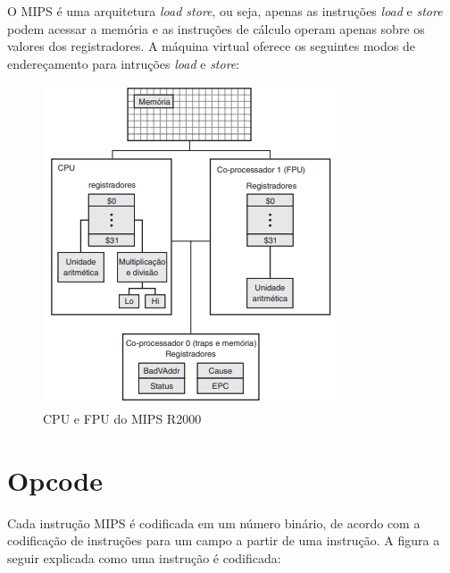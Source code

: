 \documentclass[
	12pt,				%
	oneside,			%
	a4paper,			%
	english,			%
	brazil				%
	]{abntex2ppgsi}
\begin{document}
O MIPS é uma arquitetura \textit{load store}, ou seja, apenas as instruções \textit{load} e \textit{store} podem acessar a memória e as instruções de cálculo operam apenas sobre os valores dos registradores. A máquina virtual oferece os seguintes modos de endereçamento para intruções \textit{load} e \textit{store}: 

\begin{figure}[h]
    \centering
    \includegraphics[width=0.75\linewidth]{modosEnd1.png}
    \caption{CPU e FPU do MIPS R2000}
    \label{figModEnd1}
\end{figure}

\section{Opcode}

Cada instrução MIPS é codificada em um número binário, de acordo com a codificação de instruções para um campo a partir de uma instrução. A figura a seguir explicada como uma instrução é codificada:
\end{document}
